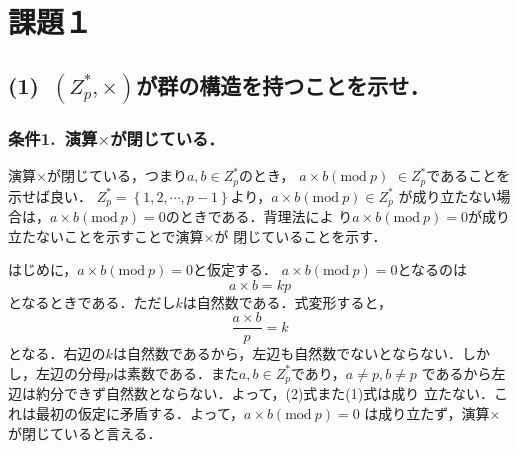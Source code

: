 \documentclass[a4paper,12pt]{jarticle}
\begin{document}
%
\title{\vspace{-30mm} }
\date{}
%
\maketitle
%
\vspace{-30mm}
%
\setlength{\abovedisplayskip}{0pt} %
\setlength{\belowdisplayskip}{0pt} %

\section*{課題１}
\vspace{-3mm}
\subsection*{(1)~$(Z_p^*,\times)$が群の構造を持つことを示せ．}
\subsubsection*{条件1.~演算$\times$が閉じている．}
\vspace{-4mm}
演算$\times$が閉じている，つまり$a,b\in Z_p^*$のとき，
$a\times b(\mathrm{mod}~p)$ $\in Z_p^*$であることを示せば良い．
$Z_p^*= \left\{1,2,\cdots,p-1 \right\}$より，$a\times b(\mathrm{mod}~p)\in Z_p^*$
が成り立たない場合は，$a\times b(\mathrm{mod}~p)=0$のときである．背理法によ
り$a\times b(\mathrm{mod}~p)=0$が成り立たないことを示すことで演算$\times$が
閉じていることを示す．

はじめに，$a\times b(\mathrm{mod}~p)=0$と仮定する．
$a\times b(\mathrm{mod}~p)=0$となるのは
%
\begin{equation}
 a \times b =kp
\end{equation}
%
となるときである．ただし$k$は自然数である．式変形すると，
%
\begin{equation}
 \frac{a \times b}{p} = k
\end{equation}
%
となる．右辺の$k$は自然数であるから，左辺も自然数でないとならない．しか
し，左辺の分母$p$は素数である．また$a,b\in Z_p^*$であり，$a\neq p,b\neq p$
であるから左辺は約分できず自然数とならない．よって，(2)式また(1)式は成り
立たない．これは最初の仮定に矛盾する．よって，$a\times b(\mathrm{mod}~p)=0$
は成り立たず，演算$\times$が閉じていると言える．
%
\vspace{-6mm}
\end{document}
